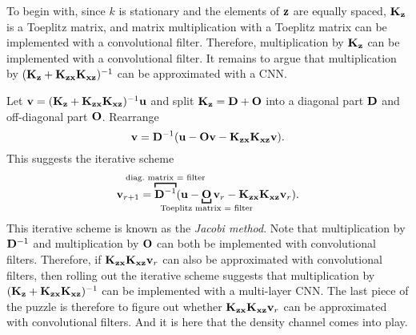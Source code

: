 \documentclass[12pt]{report}
\begin{document}
To begin with, since $k$ is stationary and the elements of $\mathbf{z}$ are equally spaced, $\mathbf{K}_{\mathbf{z}}$ is a Toeplitz matrix, and matrix multiplication with a Toeplitz matrix can be implemented with a convolutional filter.
Therefore, multiplication by $\mathbf{K}_{\mathbf{z}}$ can be implemented with a convolutional filter.
It remains to argue that multiplication by $(\mathbf{K}_{\mathbf{z}} + \mathbf{K}_{\mathbf{z}\mathbf{x}} \mathbf{K}_{\mathbf{x}\mathbf{z}})^{-1}$ can be approximated with a CNN.

Let $\mathbf{v} = (\mathbf{K}_{\mathbf{z}} + \mathbf{K}_{\mathbf{z}\mathbf{x}} \mathbf{K}_{\mathbf{x}\mathbf{z}})^{-1} \mathbf{u}$ and split $\mathbf{K}_{\mathbf{z}} = \mathbf{D} + \mathbf{O}$ into a diagonal part $\mathbf{D}$ and off-diagonal part $\mathbf{O}$.
Rearrange
\begin{equation}
    \mathbf{v} = \mathbf{D}^{-1} (\mathbf{u} - \mathbf{O}\mathbf{v} - \mathbf{K}_{\mathbf{z}\mathbf{x}} \mathbf{K}_{\mathbf{x}\mathbf{z}}\mathbf{v}).
\end{equation}
This suggests the iterative scheme
\begin{equation}
    \vv_{r+1} = \overbracket[1pt]{\mD^{-1}}^{\mathclap{\text{diag.\ matrix $=$ filter}}} (\vu - \underbracket[1pt]{\mO}_{\mathclap{\text{Toeplitz matrix $=$ filter}}} \vv_r - \mK_{\vz\vx} \mK_{\vx\vz}\vv_r).
\end{equation}
This iterative scheme is known as the \emph{Jacobi method}.
Note that multiplication by $\mathbf{D}^{-1}$ and multiplication by $\mathbf{O}$ can both be implemented with convolutional filters.
Therefore, if $\mathbf{K}_{\mathbf{z}\mathbf{x}} \mathbf{K}_{\mathbf{x}\mathbf{z}}\mathbf{v}_r$ can also be approximated with convolutional filters, then rolling out the iterative scheme suggests that multiplication by $(\mathbf{K}_{\mathbf{z}} + \mathbf{K}_{\mathbf{z}\mathbf{x}} \mathbf{K}_{\mathbf{x}\mathbf{z}})^{-1}$ can be implemented with a multi-layer CNN.
The last piece of the puzzle is therefore to figure out whether $\mathbf{K}_{\mathbf{z}\mathbf{x}} \mathbf{K}_{\mathbf{x}\mathbf{z}}\mathbf{v}_r$ can be approximated with convolutional filters.
And it is here that the density channel comes into play.
\end{document}
